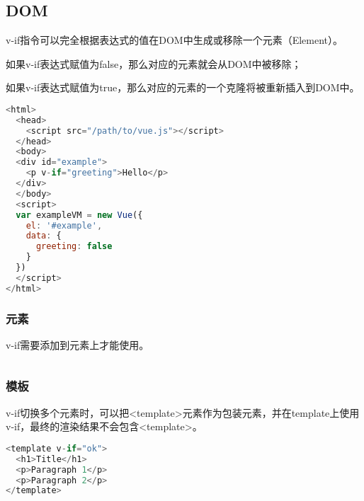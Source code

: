 \subsection{DOM}

v-if指令可以完全根据表达式的值在DOM中生成或移除一个元素（Element）。

\begin{compactitem}
\item 如果v-if表达式赋值为false，那么对应的元素就会从DOM中被移除；
\item 如果v-if表达式赋值为true，那么对应的元素的一个克隆将被重新插入到DOM中。
\end{compactitem}


\begin{lstlisting}[language=JavaScript]
<html>
  <head>
    <script src="/path/to/vue.js"></script>
  </head>
  <body>
  <div id="example">
    <p v-if="greeting">Hello</p>
  </div>
  </body>
  <script>
  var exampleVM = new Vue({
    el: '#example',
    data: {
      greeting: false
    }
  })
  </script>
</html>
\end{lstlisting}

\subsubsection{元素}

v-if需要添加到元素上才能使用。

\begin{lstlisting}[language=JavaScript]

\end{lstlisting}


\subsubsection{模板}

v-if切换多个元素时，可以把<template>元素作为包装元素，并在template上使用v-if，最终的渲染结果不会包含<template>。


\begin{lstlisting}[language=JavaScript]
<template v-if="ok">
  <h1>Title</h1>
  <p>Paragraph 1</p>
  <p>Paragraph 2</p>
</template>
\end{lstlisting}




\begin{lstlisting}[language=JavaScript]

\end{lstlisting}




